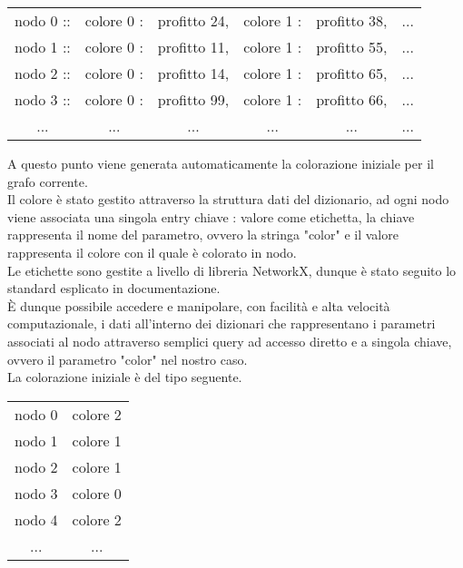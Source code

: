 \begin{table}[h]
\centering
\begin{tabular}{llllll}
\multicolumn{1}{c}{nodo 0 ::} & \multicolumn{1}{c}{colore 0 :} & \multicolumn{1}{c}{profitto 24,} & \multicolumn{1}{c}{colore 1 :} & \multicolumn{1}{c}{profitto 38,} & \multicolumn{1}{c}{...} \\
nodo 1 :: & colore 0 : & profitto 11, & colore 1 : & profitto 55, & ... \\
nodo 2 :: & colore 0 : & profitto 14, & colore 1 : & profitto 65, & ... \\
nodo 3 :: & colore 0 : & profitto 99, & colore 1 : & profitto 66, & ... \\
\multicolumn{1}{c}{...} & \multicolumn{1}{c}{...} & \multicolumn{1}{c}{...} & \multicolumn{1}{c}{...} & \multicolumn{1}{c}{...} & \multicolumn{1}{c}{...}
\end{tabular}
\end{table}

A questo punto viene generata automaticamente la colorazione iniziale per il grafo corrente.\\
Il colore è stato gestito attraverso la struttura dati del dizionario, ad ogni nodo viene associata una singola entry chiave : valore come etichetta, la chiave rappresenta il nome del parametro, ovvero la stringa "color" e il valore rappresenta il colore con il quale è colorato in nodo.\\
Le etichette sono gestite a livello di libreria NetworkX, dunque è stato seguito lo standard esplicato in documentazione.\\
È dunque possibile accedere e manipolare, con facilità e alta velocità computazionale, i dati all'interno dei dizionari che rappresentano i parametri associati al nodo attraverso semplici query ad accesso diretto e a singola chiave, ovvero il parametro "color" nel nostro caso.\\
La colorazione iniziale è del tipo seguente.

\begin{table}[h]
\centering
\begin{tabular}{cc}
nodo 0 & colore 2 \\
nodo 1 & colore 1 \\
nodo 2 & colore 1 \\
nodo 3 & colore 0 \\
nodo 4 & colore 2 \\
... & ...
\end{tabular}
\end{table}

